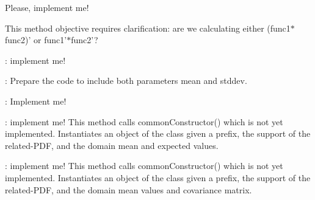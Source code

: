 \begin{DoxyRefList}
\item[\label{todo__todo000006}%
\hypertarget{todo__todo000006}{}%
Member \hyperlink{class_q_u_e_s_o_1_1_func_times_func1_d1_d_function_aac7e1e05101253947079615bf7b5ce6b}{Q\-U\-E\-S\-O\-:\-:Func\-Times\-Func1\-D1\-D\-Function\-:\-:deriv} (double domain\-Value) const ]Please, implement me! \par
This method objective requires clarification\-: are we calculating either (func1$\ast$func2)' or func1'$\ast$func2'?  
\item[\label{todo__todo000017}%
\hypertarget{todo__todo000017}{}%
Member \hyperlink{class_q_u_e_s_o_1_1_gamma_vector_r_v_ae6b687ef1f325e3eea4dd63a1660110a}{Q\-U\-E\-S\-O\-:\-:Gamma\-Vector\-R\-V$<$ V, M $>$\-:\-:print} (std\-::ostream \&os) const ]\-: implement me!  
\item[\label{todo__todo000010}%
\hypertarget{todo__todo000010}{}%
Member \hyperlink{class_q_u_e_s_o_1_1_gaussian_hermite1_d_quadrature_a93622cfcdf05cb9a7961c76b4d749b55}{Q\-U\-E\-S\-O\-:\-:Gaussian\-Hermite1\-D\-Quadrature\-:\-:Gaussian\-Hermite1\-D\-Quadrature} (double mean, double stddev, unsigned int order)]\-: Prepare the code to include both parameters {\ttfamily mean} and {\ttfamily stddev}.  
\item[\label{todo__todo000018}%
\hypertarget{todo__todo000018}{}%
Class \hyperlink{class_q_u_e_s_o_1_1_gaussian_vector_cdf}{Q\-U\-E\-S\-O\-:\-:Gaussian\-Vector\-Cdf$<$ V, M $>$} ]\-: Implement me!  
\item[\label{todo__todo000019}%
\hypertarget{todo__todo000019}{}%
Member \hyperlink{class_q_u_e_s_o_1_1_gaussian_vector_cdf_aeb3e7d0cc777d58fb93d046a9da12071}{Q\-U\-E\-S\-O\-:\-:Gaussian\-Vector\-Cdf$<$ V, M $>$\-:\-:Gaussian\-Vector\-Cdf} (const char $\ast$prefix, const Vector\-Set$<$ V, M $>$ \&pdf\-Support, const V \&domain\-Expected\-Values, const V \&domain\-Variance\-Values)]\-: implement me! This method calls common\-Constructor() which is not yet implemented. Instantiates an object of the class given a prefix, the support of the related-\/\-P\-D\-F, and the domain mean and expected values.  
\item[\label{todo__todo000020}%
\hypertarget{todo__todo000020}{}%
Member \hyperlink{class_q_u_e_s_o_1_1_gaussian_vector_cdf_a2f0d23a52c90f82877363de1155b788f}{Q\-U\-E\-S\-O\-:\-:Gaussian\-Vector\-Cdf$<$ V, M $>$\-:\-:Gaussian\-Vector\-Cdf} (const char $\ast$prefix, const Vector\-Set$<$ V, M $>$ \&pdf\-Support, const V \&domain\-Expected\-Values, const M \&cov\-Matrix)]\-: implement me! This method calls common\-Constructor() which is not yet implemented. Instantiates an object of the class given a prefix, the support of the related-\/\-P\-D\-F, and the domain mean values and covariance matrix.  

\end{DoxyRefList}
